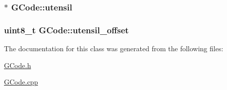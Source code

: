 \hypertarget{class_g_code_a9a737c33f133cf515926d0f2b612bd22}{
\subsubsection[{utensil}]{$\ast$ G\+Code\+::utensil}}\label{class_g_code_a9a737c33f133cf515926d0f2b612bd22}
\hypertarget{class_g_code_a33ac8c517b978b71a6af37c362dc3edb}{
\subsubsection[{utensil\+\_\+offset}]{\setlength{\rightskip}{0pt plus 5cm}uint8\+\_\+t G\+Code\+::utensil\+\_\+offset}}\label{class_g_code_a33ac8c517b978b71a6af37c362dc3edb}


The documentation for this class was generated from the following files\+:\begin{DoxyCompactItemize}
\item 
\hyperlink{_g_code_8h}{G\+Code.\+h}\item 
\hyperlink{_g_code_8cpp}{G\+Code.\+cpp}\end{DoxyCompactItemize}
